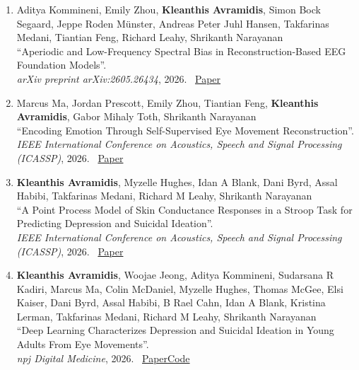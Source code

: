 \documentclass[margin]{res}
\begin{document}
\begin{resume}
\begin{enumerate}[leftmargin=*,itemsep=3pt]
\item \begin{minipage}[t]{\linewidth}\raggedright
    Aditya Kommineni, Emily Zhou, \textbf{Kleanthis Avramidis}, Simon Bock Segaard, Jeppe Roden Münster, Andreas Peter Juhl Hansen, Takfarinas Medani, Tiantian Feng, Richard Leahy, Shrikanth Narayanan \\
    ``Aperiodic and Low-Frequency Spectral Bias in Reconstruction-Based EEG Foundation Models''. \\
    \textit{arXiv preprint arXiv:2605.26434}, 2026. \ \href{https://arxiv.org/abs/2605.26434}{Paper}
\end{minipage}

\item \begin{minipage}[t]{\linewidth}\raggedright
    Marcus Ma, Jordan Prescott, Emily Zhou, Tiantian Feng, \textbf{Kleanthis Avramidis}, Gabor Mihaly Toth, Shrikanth Narayanan \\
    ``Encoding Emotion Through Self-Supervised Eye Movement Reconstruction''. \\
    \textit{IEEE International Conference on Acoustics, Speech and Signal Processing (ICASSP)}, 2026. \ \href{https://ieeexplore.ieee.org/abstract/document/11463336/}{Paper}
\end{minipage}

\item \begin{minipage}[t]{\linewidth}\raggedright
    \textbf{Kleanthis Avramidis}, Myzelle Hughes, Idan A Blank, Dani Byrd, Assal Habibi, Takfarinas Medani, Richard M Leahy, Shrikanth Narayanan \\
    ``A Point Process Model of Skin Conductance Responses in a Stroop Task for Predicting Depression and Suicidal Ideation''. \\
    \textit{IEEE International Conference on Acoustics, Speech and Signal Processing (ICASSP)}, 2026. \ \href{https://ieeexplore.ieee.org/abstract/document/11460710/}{Paper}
\end{minipage}

\item \begin{minipage}[t]{\linewidth}\raggedright
    \textbf{Kleanthis Avramidis}, Woojae Jeong, Aditya Kommineni, Sudarsana R Kadiri, Marcus Ma, Colin McDaniel, Myzelle Hughes, Thomas McGee, Elsi Kaiser, Dani Byrd, Assal Habibi, B Rael Cahn, Idan A Blank, Kristina Lerman, Takfarinas Medani, Richard M Leahy, Shrikanth Narayanan \\
    ``Deep Learning Characterizes Depression and Suicidal Ideation in Young Adults From Eye Movements''. \\
    \textit{npj Digital Medicine}, 2026. \ \href{https://www.nature.com/articles/s41746-026-02550-4}{Paper}\enspace \href{https://github.com/usc-sail/precog-eye-dl}{Code}
\end{minipage}


\end{enumerate}
\end{resume}
\end{document}
